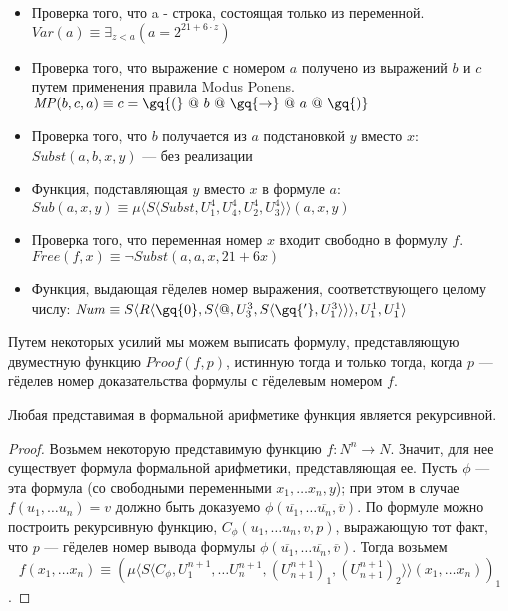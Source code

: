 \begin{itemize}
\item Проверка того, что a - строка, состоящая только из переменной.
$\mathit{Var}(a) \equiv \exists_{z < a} (a = 2 ^ {21 + 6\cdot z})$

\item Проверка того, что выражение с номером $a$ получено из выражений $b$ и $c$ 
путем применения правила Modus Ponens.
$\mathit{MP} (b,c,a) \equiv c = \gq{(} ~@~ b ~@~ \gq{\rightarrow} ~@~ a ~@~ \gq{)}$

\item Проверка того, что $b$ получается из $a$ подстановкой $y$ вместо $x$:
$\mathit{Subst} (a,b,x,y)$ --- без реализации

\item Функция, подставляющая $y$ вместо $x$ в формуле $a$:\\
$\mathit{Sub} (a,x,y) \equiv \mu \langle{}S\langle{}\mathit{Subst},U^4_1,U^4_4,U^4_2,U^4_3\rangle\rangle(a,x,y)$

\item Проверка того, что переменная номер $x$ входит свободно в формулу $f$.\\
$\mathit{Free} (f,x) \equiv \neg \mathit{Subst}(a,a,x,21 + 6x)$

\item Функция, выдающая гёделев номер выражения, соответствующего целому числу:
$\mathit{Num} \equiv S\langle{}R\langle{}\gq{0},S\langle{}@,U^3_3,S\langle{}\gq{'},U^3_1\rangle{}\rangle{}\rangle,U^1_1,U^1_1\rangle{}$

\end{itemize}

Путем некоторых усилий мы можем выписать формулу, представляющую
двуместную функцию $\mathit{Proof}(f,p)$, истинную тогда и только тогда, когда
$p$ --- гёделев номер доказательства формулы с гёделевым номером $f$.

\begin{theorem}
Любая представимая в формальной арифметике функция является рекурсивной.
\end{theorem}
\begin{proof}
Возьмем некоторую представимую функцию $f: N^n \rightarrow N$. Значит, для нее существует
формула формальной арифметики, представляющая ее. Пусть $\phi$ --- эта формула
(со свободными переменными $x_1, \dots x_n, y$); при этом в случае 
$f(u_1, \dots u_n) = v$ должно быть доказуемо $\phi(\overline{u_1}, \dots \overline{u_n}, \overline{v})$.
По формуле можно построить рекурсивную функцию, $C_\phi (u_1, \dots u_n, v, p)$, 
выражающую тот факт, что $p$ --- гёделев номер вывода формулы 
$\phi(\overline{u_1}, \dots \overline{u_n}, \overline{v})$. Тогда 
возьмем $$f (x_1, \dots x_n) \equiv (\mu \langle{}S\langle{}C_\phi,U^{n+1}_1,\dots U^{n+1}_n,(U^{n+1}_{n+1})_1, (U^{n+1}_{n+1})_2\rangle\rangle (x_1, \dots x_n))_1$$.
\end{proof}
